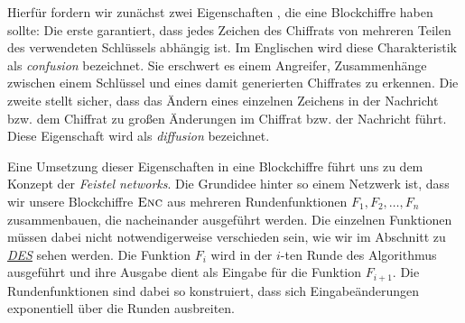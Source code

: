 Hierfür fordern wir zunächst zwei Eigenschaften \cite{Shannon1949}, die eine Blockchiffre haben sollte:
Die erste garantiert, dass jedes Zeichen des Chiffrats von mehreren Teilen des verwendeten Schlüssels abhängig ist. Im Englischen wird diese Charakteristik als \emph{confusion} bezeichnet. Sie erschwert es einem Angreifer, Zusammenhänge zwischen einem Schlüssel und eines damit generierten Chiffrates zu erkennen. 
Die zweite stellt sicher, dass das Ändern eines einzelnen Zeichens in der Nachricht bzw. dem Chiffrat zu großen Änderungen im Chiffrat bzw. der Nachricht führt. Diese Eigenschaft wird als \emph{diffusion} bezeichnet.

Eine Umsetzung dieser Eigenschaften in eine Blockchiffre führt uns zu dem Konzept der \emph{Feistel networks}.
Die Grundidee hinter so einem Netzwerk ist, dass wir unsere Blockchiffre \(\textsc{Enc}\) aus mehreren Rundenfunktionen \(F_1, F_2,\dots, F_n\) zusammenbauen, die nacheinander ausgeführt werden. Die einzelnen Funktionen müssen dabei nicht notwendigerweise verschieden sein, wie wir im Abschnitt zu \hyperref[sssec:des]{\emph{DES}} sehen werden. Die Funktion \(F_i\) wird in der $i$-ten Runde des Algorithmus ausgeführt und ihre Ausgabe dient als Eingabe für die Funktion \(F_{i+1}\). Die Rundenfunktionen sind dabei so konstruiert, dass sich Eingabeänderungen exponentiell über die Runden ausbreiten.

